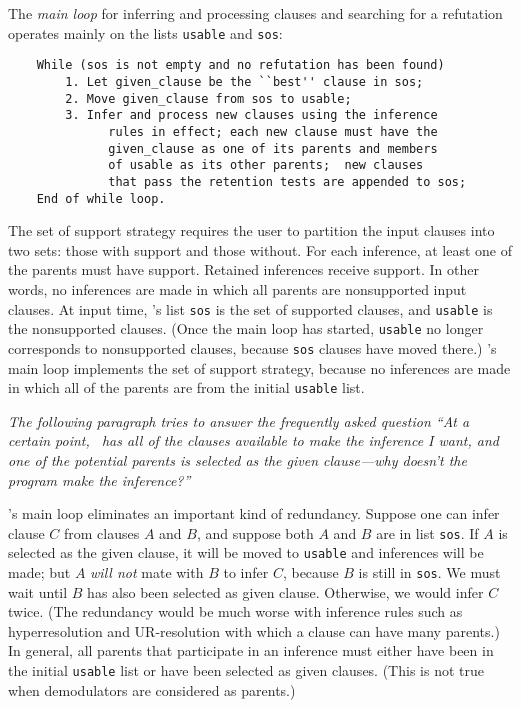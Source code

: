 \documentclass[11pt]{article}
\begin{document}
\noindent
The {\em main loop} for inferring and processing clauses and
searching for a refutation operates mainly on the lists \verb:usable:
and \verb:sos::

{\small
\begin{verbatim}
    While (sos is not empty and no refutation has been found)
        1. Let given_clause be the ``best'' clause in sos;
        2. Move given_clause from sos to usable;
        3. Infer and process new clauses using the inference
              rules in effect; each new clause must have the
              given_clause as one of its parents and members
              of usable as its other parents;  new clauses
              that pass the retention tests are appended to sos;
    End of while loop.
\end{verbatim}
} 

The set of support strategy requires the user to partition the
input clauses into two sets: those with support and those without.
For each inference, at least one of the parents must have support.
Retained inferences receive support.  In other words, no inferences
are made in which all parents are nonsupported input clauses.  At
input time, \otter's list \verb:sos: is the set of supported clauses,
and \verb:usable: is the nonsupported clauses.  (Once the main loop
has started, \verb:usable: no longer corresponds to nonsupported
clauses, because \verb:sos: clauses have moved there.)  \otter's
main loop implements the set of support strategy, because no
inferences are made in which all of the parents are from the initial
\verb:usable: list.

{\em The following paragraph tries to answer the frequently asked
question ``At a certain point, \otter\ has all of the clauses available
to make the inference I want, and one of the potential parents is
selected as the given clause---why doesn't the program make
the inference?''}

\otter's main loop eliminates an important kind of redundancy.
Suppose one can infer clause $C$ from clauses $A$ and $B$, and suppose
both $A$ and $B$ are in list \verb:sos:.  If $A$ is selected as the
given clause, it will be moved to \verb:usable: and inferences
will be made; but $A$ {\em will not} mate with $B$ to infer $C$,
because $B$ is still in \verb:sos:.  We must wait until $B$ has also
been selected as given clause.  Otherwise, we would infer $C$
twice.  (The redundancy would be much worse with inference rules such as
hyperresolution and UR-resolution with which a clause can have
many parents.)  In general,
all parents that participate in an inference must either have been in
the initial \verb:usable: list or have been selected as given clauses.
(This is not true when demodulators are considered as parents.)
\end{document}

